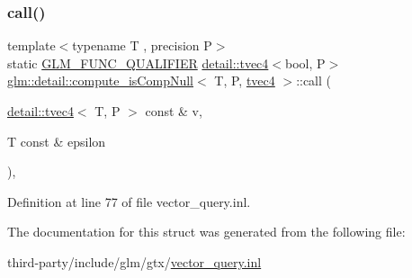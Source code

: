 \subsubsection{\texorpdfstring{call()}{call()}}
{\footnotesize\ttfamily template$<$typename T , precision P$>$ \\
static \hyperlink{setup_8hpp_a33fdea6f91c5f834105f7415e2a64407}{G\+L\+M\+\_\+\+F\+U\+N\+C\+\_\+\+Q\+U\+A\+L\+I\+F\+I\+ER} \hyperlink{structglm_1_1detail_1_1tvec4}{detail\+::tvec4}$<$bool, P$>$ \hyperlink{structglm_1_1detail_1_1compute__is_comp_null}{glm\+::detail\+::compute\+\_\+is\+Comp\+Null}$<$ T, P, \hyperlink{structglm_1_1detail_1_1tvec4}{tvec4} $>$\+::call (\begin{DoxyParamCaption}\item[{\hyperlink{structglm_1_1detail_1_1tvec4}{detail\+::tvec4}$<$ T, P $>$ const \&}]{v,  }\item[{T const \&}]{epsilon }\end{DoxyParamCaption})\hspace{0.3cm}{\ttfamily [inline]}, {\ttfamily [static]}}



Definition at line 77 of file vector\+\_\+query.\+inl.



The documentation for this struct was generated from the following file\+:\begin{DoxyCompactItemize}
\item 
third-\/party/include/glm/gtx/\hyperlink{vector__query_8inl}{vector\+\_\+query.\+inl}\end{DoxyCompactItemize}

